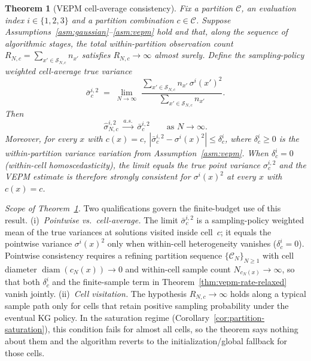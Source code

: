\documentclass[12pt]{article}
\theoremstyle{plain}
\newtheorem{theorem}{Theorem}[section]
\theoremstyle{definition}
\theoremstyle{remark}
\begin{document}
\begin{theorem}[VEPM cell-average consistency]\label{thm:vepm-consistency}
Fix a partition $\mathcal{C}$, an evaluation index $i\in\{1,2,3\}$ and a
partition combination $c\in\mathcal{C}$.  Suppose
Assumptions~\ref{asm:gaussian}--\ref{asm:vepm} hold and that, along the
sequence of algorithmic stages, the total within-partition observation
count $R_{N,c}=\sum_{x'\in\mathcal{S}_{N,c}}n_{x'}$ satisfies
$R_{N,c}\to\infty$ almost surely.  Define the sampling-policy
weighted cell-average true variance
\[
  \bar{\sigma}_{c}^{i,2} \;=\;
  \lim_{N\to\infty}\;
  \frac{\sum_{x'\in\mathcal{S}_{N,c}} n_{x'}\, \sigma^{i}(x')^{2}}
       {\sum_{x'\in\mathcal{S}_{N,c}} n_{x'}}.
\]
Then
\[
  \hat{\sigma}_{N,c}^{i,2} \;\xrightarrow{a.s.}\; \bar{\sigma}_{c}^{i,2}
  \qquad\text{as } N\to\infty.
\]
Moreover, for every $x$ with $c(x)=c$,
$|\bar{\sigma}_{c}^{i,2} - \sigma^{i}(x)^{2}| \le \delta_{c}^{i}$,
where $\delta_{c}^{i}\ge 0$ is the within-partition variance variation
from Assumption~\ref{asm:vepm}.  When $\delta_{c}^{i}=0$ (within-cell
homoscedasticity), the limit equals the true point variance
$\sigma_{c}^{i,2}$ and the VEPM estimate is therefore strongly
consistent for $\sigma^{i}(x)^{2}$ at every $x$ with $c(x)=c$.
\end{theorem}

\noindent\emph{Scope of Theorem~\ref{thm:vepm-consistency}.}  Two
qualifications govern the finite-budget use of this result.  (i)~\emph{Pointwise vs.\
cell-average.}  The limit $\bar{\sigma}_{c}^{i,2}$ is a sampling-policy
weighted mean of the true variances at solutions visited inside cell~$c$;
it equals the pointwise variance $\sigma^{i}(x)^{2}$ only when within-cell
heterogeneity vanishes ($\delta_{c}^{i}=0$).  Pointwise consistency
requires a refining partition sequence $\{\mathcal{C}_{N}\}_{N\ge 1}$ with
cell diameter $\operatorname{diam}(c_{N}(x))\to 0$ and within-cell sample
count $N_{c_{N}(x)}\to\infty$, so that both $\delta_{c}^{i}$ and the
finite-sample term in Theorem~\ref{thm:vepm-rate-relaxed} vanish jointly.
(ii)~\emph{Cell visitation.}  The hypothesis $R_{N,c}\to\infty$ holds along
a typical sample path only for cells that retain positive sampling
probability under the eventual KG policy.  In the saturation regime
(Corollary~\ref{cor:partition-saturation}), this condition fails for
almost all cells, so the theorem says nothing about them and the
algorithm reverts to the initialization/global fallback for those cells.
\end{document}
